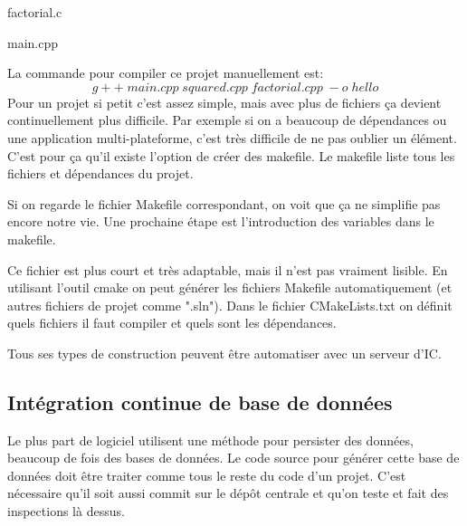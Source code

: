 factorial.c



main.cpp


La commande pour compiler ce projet manuellement est:
$$g++\;main.cpp\;squared.cpp\;factorial.cpp\;-o\;hello$$
Pour un projet si petit c'est assez simple, mais avec plus de fichiers ça devient continuellement plus difficile.
Par exemple si on a beaucoup de dépendances ou une application multi-plateforme, c'est très difficile de ne pas oublier un élément.
\newpage
C'est pour ça qu'il existe l'option de créer des makefile. Le makefile liste tous les fichiers et dépendances du projet.

Si on regarde le fichier Makefile correspondant, on voit que ça ne simplifie pas encore notre vie. Une prochaine étape est l'introduction des variables dans le makefile.


Ce fichier est plus court et très adaptable, mais il n'est pas vraiment lisible.
En utilisant l'outil cmake on peut générer les fichiers Makefile automatiquement (et autres fichiers de projet comme ".sln").
Dans le fichier CMakeLists.txt on définit quels fichiers il faut compiler et quels sont les dépendances.


Tous ses types de construction peuvent être automatiser avec un serveur d'IC.
\newpage

\subsection{Intégration continue de base de données}

Le plus part de logiciel utilisent une méthode pour persister des données, beaucoup de fois des bases de données. Le code source pour générer cette base de données doit être traiter comme tous le reste du code d'un projet. C'est nécessaire qu'il soit aussi commit sur le dépôt centrale et qu'on teste et fait des inspections là dessus.

